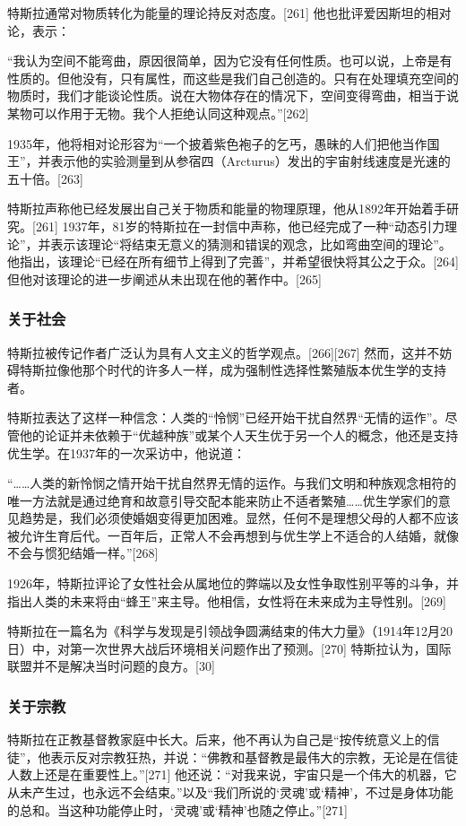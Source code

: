 特斯拉通常对物质转化为能量的理论持反对态度。[261] 他也批评爱因斯坦的相对论，表示：

“我认为空间不能弯曲，原因很简单，因为它没有任何性质。也可以说，上帝是有性质的。但他没有，只有属性，而这些是我们自己创造的。只有在处理填充空间的物质时，我们才能谈论性质。说在大物体存在的情况下，空间变得弯曲，相当于说某物可以作用于无物。我个人拒绝认同这种观点。”[262]

1935年，他将相对论形容为“一个披着紫色袍子的乞丐，愚昧的人们把他当作国王”，并表示他的实验测量到从参宿四（Arcturus）发出的宇宙射线速度是光速的五十倍。[263]

特斯拉声称他已经发展出自己关于物质和能量的物理原理，他从1892年开始着手研究。[261] 1937年，81岁的特斯拉在一封信中声称，他已经完成了一种“动态引力理论”，并表示该理论“将结束无意义的猜测和错误的观念，比如弯曲空间的理论”。他指出，该理论“已经在所有细节上得到了完善”，并希望很快将其公之于众。[264] 但他对该理论的进一步阐述从未出现在他的著作中。[265]
\subsubsection{关于社会}
特斯拉被传记作者广泛认为具有人文主义的哲学观点。[266][267] 然而，这并不妨碍特斯拉像他那个时代的许多人一样，成为强制性选择性繁殖版本优生学的支持者。

特斯拉表达了这样一种信念：人类的“怜悯”已经开始干扰自然界“无情的运作”。尽管他的论证并未依赖于“优越种族”或某个人天生优于另一个人的概念，他还是支持优生学。在1937年的一次采访中，他说道：

“……人类的新怜悯之情开始干扰自然界无情的运作。与我们文明和种族观念相符的唯一方法就是通过绝育和故意引导交配本能来防止不适者繁殖……优生学家们的意见趋势是，我们必须使婚姻变得更加困难。显然，任何不是理想父母的人都不应该被允许生育后代。一百年后，正常人不会再想到与优生学上不适合的人结婚，就像不会与惯犯结婚一样。”[268]

1926年，特斯拉评论了女性社会从属地位的弊端以及女性争取性别平等的斗争，并指出人类的未来将由“蜂王”来主导。他相信，女性将在未来成为主导性别。[269]

特斯拉在一篇名为《科学与发现是引领战争圆满结束的伟大力量》（1914年12月20日）中，对第一次世界大战后环境相关问题作出了预测。[270] 特斯拉认为，国际联盟并不是解决当时问题的良方。[30]
\subsubsection{关于宗教}  
特斯拉在正教基督教家庭中长大。后来，他不再认为自己是“按传统意义上的信徒”，他表示反对宗教狂热，并说：“佛教和基督教是最伟大的宗教，无论是在信徒人数上还是在重要性上。”[271] 他还说：“对我来说，宇宙只是一个伟大的机器，它从未产生过，也永远不会结束。”以及“我们所说的‘灵魂’或‘精神’，不过是身体功能的总和。当这种功能停止时，‘灵魂’或‘精神’也随之停止。”[271]
